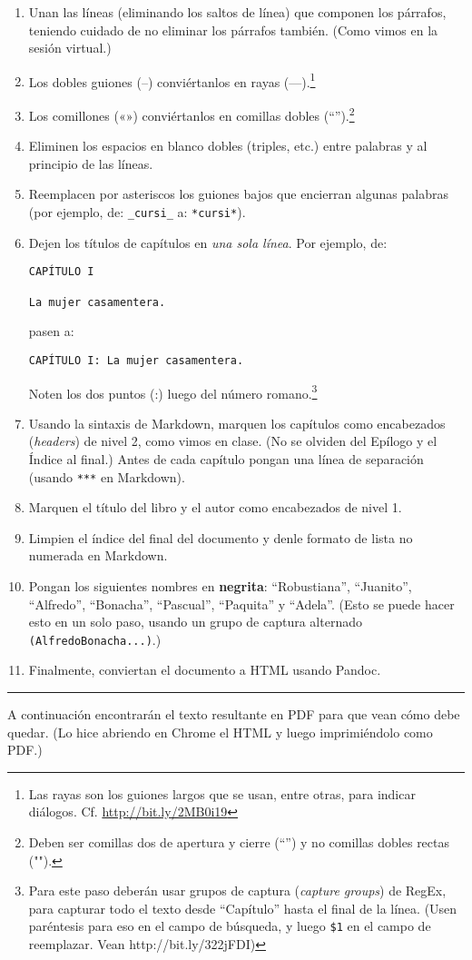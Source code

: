 \documentclass[12pt,
              article,
              oneside
              ]{memoir}
\begin{document}
\begin{enumerate}

\item
  Unan las líneas (eliminando los saltos de línea) que componen los
  párrafos, teniendo cuidado de no eliminar los párrafos también. (Como
  vimos en la sesión virtual.)
\item
  Los dobles guiones (--) conviértanlos en rayas (---).\footnote{Las rayas son
  los guiones largos que se usan, entre otras, para indicar diálogos.
  Cf. \url{http://bit.ly/2MB0i19}}
\item
  Los comillones («») conviértanlos en comillas dobles (``'').\footnote{Deben ser comillas dos de apertura y cierre (``'') y no comillas dobles rectas ("").}
\item
  Eliminen los espacios en blanco dobles (triples, etc.) entre palabras
  y al principio de las líneas.
\item
  Reemplacen por asteriscos los guiones bajos que encierran algunas
  palabras (por ejemplo, de: \texttt{\_cursi\_} a: \texttt{*cursi*}).
\item
  Dejen los títulos de capítulos en \emph{una sola línea}. Por ejemplo,
  de:

\begin{verbatim}
CAPÍTULO I

La mujer casamentera.
\end{verbatim}

pasen a:

\begin{verbatim}
CAPÍTULO I: La mujer casamentera.
\end{verbatim}

Noten los dos puntos (:) luego del número romano.\footnote{Para este paso deberán
usar grupos de captura (\emph{capture groups}) de RegEx, para capturar
todo el texto desde ``Capítulo'' hasta el final de la línea. (Usen
paréntesis para eso en el campo de búsqueda, y luego \texttt{\$1} en el
campo de reemplazar. Vean http://bit.ly/322jFDI)}

\item
  Usando la sintaxis de Markdown, marquen los capítulos como encabezados
  (\emph{headers}) de nivel 2, como vimos en clase. (No se olviden del
  Epílogo y el Índice al final.) Antes de cada capítulo pongan una línea
  de separación (usando \texttt{***} en Markdown).
\item
  Marquen el título del libro y el autor como encabezados de nivel 1.
\item
  Limpien el índice del final del documento y denle formato de lista no
  numerada en Markdown.
\item
  Pongan los siguientes nombres en \textbf{negrita}: ``Robustiana'', ``Juanito'',
  ``Alfredo'', ``Bonacha'', ``Pascual'', ``Paquita'' y ``Adela''. (Esto
  se puede hacer esto en un solo paso, usando un grupo de captura
  alternado \texttt{(Alfredo\textbar{}Bonacha\textbar{}...)}.)
\item
  Finalmente, conviertan el documento a HTML usando Pandoc.
\end{enumerate}

\begin{center}\rule{0.5\linewidth}{\linethickness}\end{center}

A continuación encontrarán el texto resultante en PDF para que vean cómo
debe quedar. (Lo hice abriendo en Chrome el HTML y luego imprimiéndolo como PDF.)
\end{document}
